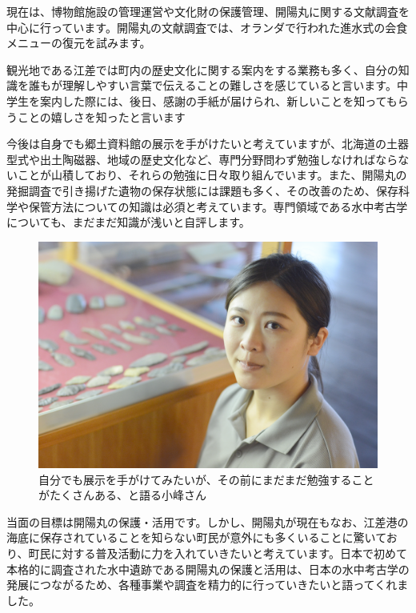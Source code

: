 \documentclass[a4j,11pt,twocolumn,openany]{jsbook}
\begin{document}
現在は、博物館施設の管理運営や文化財の保護管理、開陽丸に関する文献調査を中心に行っています。開陽丸の文献調査では、オランダで行われた進水式の会食メニューの復元を試みます。

観光地である江差では町内の歴史文化に関する案内をする業務も多く、自分の知識を誰もが理解しやすい言葉で伝えることの難しさを感じていると言います。中学生を案内した際には、後日、感謝の手紙が届けられ、新しいことを知ってもらうことの嬉しさを知ったと言います

今後は自身でも郷土資料館の展示を手がけたいと考えていますが、北海道の土器型式や出土陶磁器、地域の歴史文化など、専門分野問わず勉強しなければならないことが山積しており、それらの勉強に日々取り組んでいます。また、開陽丸の発掘調査で引き揚げた遺物の保存状態には課題も多く、その改善のため、保存科学や保管方法についての知識は必須と考えています。専門領域である水中考古学についても、まだまだ知識が浅いと自評します。

\begin{figure}[ht]
	\centering
	\includegraphics[width=\linewidth]{fig/02_Komine/Komine02.png}
	\caption{
		自分でも展示を手がけてみたいが、その前にまだまだ勉強することがたくさんある、と語る小峰さん}
	\label{}
	\vspace{-1\baselineskip}
\end{figure}

当面の目標は開陽丸の保護・活用です。しかし、開陽丸が現在もなお、江差港の海底に保存されていることを知らない町民が意外にも多くいることに驚いており、町民に対する普及活動に力を入れていきたいと考えています。日本で初めて本格的に調査された水中遺跡である開陽丸の保護と活用は、日本の水中考古学の発展につながるため、各種事業や調査を精力的に行っていきたいと語ってくれました。
\end{document}
